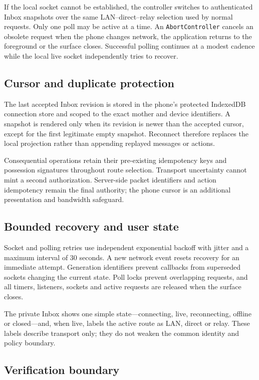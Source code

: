 If the local socket cannot be established, the controller switches to authenticated Inbox
snapshots over the same LAN--direct--relay selection used by normal requests.  Only one
poll may be active at a time.  An \texttt{AbortController} cancels an obsolete request when
the phone changes network, the application returns to the foreground or the surface closes.
Successful polling continues at a modest cadence while the local live socket independently
tries to recover.

\subsection{Cursor and duplicate protection}

The last accepted Inbox revision is stored in the phone's protected IndexedDB connection
store and scoped to the exact mother and device identifiers.  A snapshot is rendered only
when its revision is newer than the accepted cursor, except for the first legitimate empty
snapshot.  Reconnect therefore replaces the local projection rather than appending replayed
messages or actions.

Consequential operations retain their pre-existing idempotency keys and possession
signatures throughout route selection.  Transport uncertainty cannot mint a second
authorization.  Server-side packet identifiers and action idempotency remain the final
authority; the phone cursor is an additional presentation and bandwidth safeguard.

\subsection{Bounded recovery and user state}

Socket and polling retries use independent exponential backoff with jitter and a maximum
interval of 30 seconds.  A new network event resets recovery for an immediate attempt.
Generation identifiers prevent callbacks from superseded sockets changing the current
state.  Poll locks prevent overlapping requests, and all timers, listeners, sockets and
active requests are released when the surface closes.

The private Inbox shows one simple state---connecting, live, reconnecting, offline or
closed---and, when live, labels the active route as LAN, direct or relay.  These labels
describe transport only; they do not weaken the common identity and policy boundary.

\subsection{Verification boundary}

